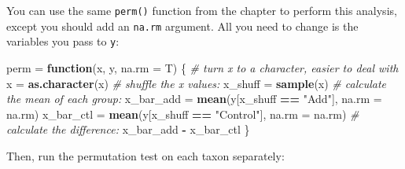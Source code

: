\documentclass[]{book}
\newenvironment{Shaded}{\begin{snugshade}}{\end{snugshade}}
\newcommand{\CommentTok}[1]{\textcolor[rgb]{0.56,0.35,0.01}{\textit{#1}}}
\newcommand{\ControlFlowTok}[1]{\textcolor[rgb]{0.13,0.29,0.53}{\textbf{#1}}}
\newcommand{\DataTypeTok}[1]{\textcolor[rgb]{0.13,0.29,0.53}{#1}}
\newcommand{\DecValTok}[1]{\textcolor[rgb]{0.00,0.00,0.81}{#1}}
\newcommand{\KeywordTok}[1]{\textcolor[rgb]{0.13,0.29,0.53}{\textbf{#1}}}
\newcommand{\NormalTok}[1]{#1}
\newcommand{\OperatorTok}[1]{\textcolor[rgb]{0.81,0.36,0.00}{\textbf{#1}}}
\newcommand{\StringTok}[1]{\textcolor[rgb]{0.31,0.60,0.02}{#1}}
\begin{document}
You can use the same \texttt{perm()} function from the chapter to perform this analysis, except you should add an \texttt{na.rm} argument. All you need to change is the variables you pass to \texttt{y}:

\begin{Shaded}
\begin{Highlighting}[]
\NormalTok{perm =}\StringTok{ }\ControlFlowTok{function}\NormalTok{(x, y, }\DataTypeTok{na.rm =}\NormalTok{ T) \{}
  \CommentTok{# turn x to a character, easier to deal with}
\NormalTok{  x =}\StringTok{ }\KeywordTok{as.character}\NormalTok{(x)}
  \CommentTok{# shuffle the x values:}
\NormalTok{  x_shuff =}\StringTok{ }\KeywordTok{sample}\NormalTok{(x)}
  \CommentTok{# calculate the mean of each group:}
\NormalTok{  x_bar_add =}\StringTok{ }\KeywordTok{mean}\NormalTok{(y[x_shuff }\OperatorTok{==}\StringTok{ "Add"}\NormalTok{], }\DataTypeTok{na.rm =}\NormalTok{ na.rm)}
\NormalTok{  x_bar_ctl =}\StringTok{ }\KeywordTok{mean}\NormalTok{(y[x_shuff }\OperatorTok{==}\StringTok{ "Control"}\NormalTok{], }\DataTypeTok{na.rm =}\NormalTok{ na.rm)}
  \CommentTok{# calculate the difference:}
\NormalTok{  x_bar_add }\OperatorTok{-}\StringTok{ }\NormalTok{x_bar_ctl}
\NormalTok{\}}
\end{Highlighting}
\end{Shaded}

Then, run the permutation test on each taxon separately:

\begin{Shaded}
\end{Shaded}
\end{document}
